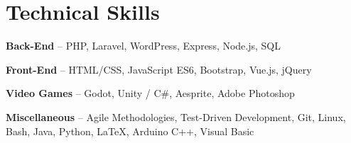 \section{Technical Skills}
\begin{small}
	\parbox[t][][t]{\linewidth}{
		\textbf{Back-End} -- PHP, Laravel, WordPress, Express, Node.js, SQL
		\smallbreak
	}
	\parbox[t][][t]{\linewidth}{
	\textbf{Front-End} -- HTML/CSS, JavaScript ES6, Bootstrap, Vue.js, jQuery
	\smallbreak
}
	\parbox[t][][t]{\linewidth}{
		\textbf{Video Games} -- Godot, Unity / C\#, Aesprite, Adobe Photoshop
		\smallbreak
	}
	\parbox[t][][t]{\linewidth}{
	\textbf{Miscellaneous} -- Agile Methodologies, Test-Driven Development, Git, Linux, Bash, Java, Python, LaTeX, Arduino C++, Visual Basic
}
\end{small}
